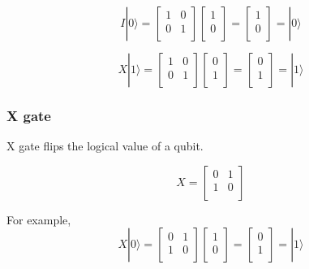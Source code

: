 \begin{equation}
 I|0\rangle = \begin{bmatrix}
1 & 0 \\
0 & 1 \\
\end{bmatrix} 
\left[
\begin{array}{c}
1 \\
0 \\
\end{array}
\right]
= \left[
\begin{array}{c}
1 \\
0 \\
\end{array}
\right]
= |0\rangle
\end{equation}

\begin{equation}
X|1\rangle = \begin{bmatrix}
1 & 0 \\
0 & 1 \\
\end{bmatrix} 
\left[
\begin{array}{c}
0 \\
1  \\
\end{array}
\right]
= \left[
\begin{array}{c}
0 \\
1 \\
\end{array}
\right]
= |1\rangle
\end{equation}


\subsubsection{X gate}

X gate flips the logical value of a qubit.

\begin{equation}
X = \begin{bmatrix}
0 & 1 \\
1 & 0 \\
\end{bmatrix}
\end{equation}

For example,
\begin{equation}
X|0\rangle = \begin{bmatrix}
0 & 1 \\
1 & 0 \\
\end{bmatrix} 
\left[
\begin{array}{c}
1 \\
0 \\
\end{array}
\right]
= \left[
\begin{array}{c}
0 \\
1 \\
\end{array}
\right]
= |1\rangle
\end{equation}

